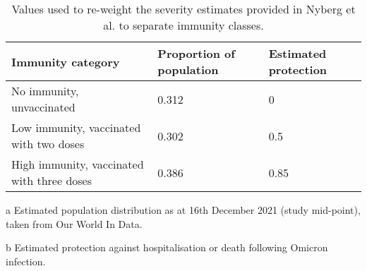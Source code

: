 \begin{table}
    \begin{threeparttable}
    \begin{tabularx}{\textwidth}{| X | X | X |}
        \hline
        \textbf{Immunity category} & \textbf{Proportion of population} \tnote{a} & \textbf{Estimated protection} \tnote{b} \\
        \hline
        No immunity, unvaccinated & 0.312 & 0 \\
        \hline
        Low immunity, vaccinated with two doses & 0.302 & 0.5 \\
        \hline
        High immunity, vaccinated with three doses & 0.386 & 0.85 \\
        \hline
	\end{tabularx}
	\caption{Values used to re-weight the severity estimates provided in Nyberg et al. to separate immunity classes.}
	\label{tab:immunity_weighting}
    \begin{tablenotes}
        \item[a] Estimated population distribution as at 16th December 2021 (study mid-point),
        taken from Our World In Data.
        \item[b] Estimated protection against hospitalisation or death following Omicron infection.
    \end{tablenotes}
    \end{threeparttable}
\end{table}


